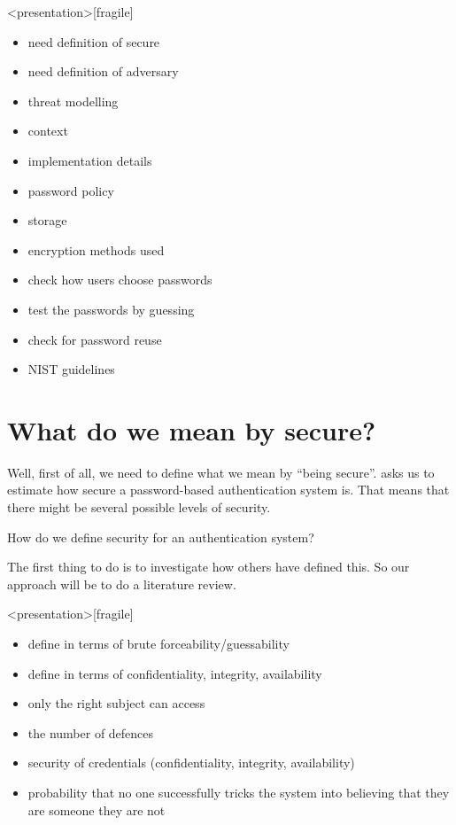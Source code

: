 \begin{frame}<presentation>[fragile]
  \begin{itemize}
    \item need definition of secure
    \item need definition of adversary
    \item threat modelling
    \item context
    \item implementation details
    \item password policy
    \item storage
    \item encryption methods used
    \item check how users choose passwords
    \item test the passwords by guessing
    \item check for password reuse
    \item NIST guidelines
  \end{itemize}
\end{frame}

\section{What do we mean by secure?}

Well, first of all, we need to define what we mean by \enquote{being secure}.
 asks us to estimate how secure a password-based authentication system 
is.
That means that there might be several possible levels of security.

\begin{frame}[fragile]
  \begin{exercise}
    How do we define security for an authentication system?
  \end{exercise}
\end{frame}

\begin{frame}
  \begin{solution}
    The first thing to do is to investigate how others have defined this.
    So our approach will be to do a literature review.
  \end{solution}
\end{frame}

\begin{frame}<presentation>[fragile]
  \begin{itemize}
    \item define in terms of brute forceability/guessability
    \item define in terms of confidentiality, integrity, availability
    \item only the right subject can access
    \item the number of defences
    \item security of credentials (confidentiality, integrity, availability)
    \item probability that no one successfully tricks the system into believing 
      that they are someone they are not
  \end{itemize}
\end{frame}

